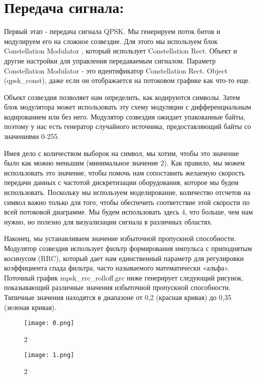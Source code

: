 \documentclass[10pt,a4paper,oneside]{article}
\begin{document}
\section{Передача сигнала:}
Первый этап - передача сигнала QPSK. Мы генерируем поток битов и модулируем его на сложное созвездие. Для этого мы используем блок Constellation Modulator , который использует Constellation Rect. Объект и другие настройки для управления передаваемым сигналом. Параметр Constellation Modulator - это идентификатор Constellation Rect. Object (qpsk_const), даже если он отображается на потоковом графике как что-то еще.

Объект созвездия позволяет нам определить, как кодируются символы. Затем блок модулятора может использовать эту схему модуляции с дифференциальным кодированием или без него. Модулятор созвездия ожидает упакованные байты, поэтому у нас есть генератор случайного источника, предоставляющий байты со значениями 0-255.

Имея дело с количеством выборок на символ, мы хотим, чтобы это значение было как можно меньшим (минимальное значение 2). Как правило, мы можем использовать это значение, чтобы помочь нам сопоставить желаемую скорость передачи данных с частотой дискретизации оборудования, которое мы будем использовать. Поскольку мы используем моделирование, количество отсчетов на символ важно только для того, чтобы обеспечить соответствие этой скорости по всей потоковой диаграмме. Мы будем использовать здесь 4, что больше, чем нам нужно, но полезно для визуализации сигнала в различных областях.

Наконец, мы устанавливаем значение избыточной пропускной способности. Модулятор созвездия использует фильтр формирования импульса с приподнятым косинусом (RRC), который дает нам единственный параметр для регулировки коэффициента спада фильтра, часто называемого математически «альфа». Поточный график mpsk_rrc_rolloff.grc ниже генерирует следующий рисунок, показывающий различные значения избыточной пропускной способности. Типичные значения находятся в диапазоне от 0,2 (красная кривая) до 0,35 (зеленая кривая).

\begin{figure}[H]
        \centering
        \texttt{[image: 0.png]}
        \caption{2}
        \label{fig:first}
\end{figure}

\begin{figure}[H]
        \centering
        \texttt{[image: 1.png]}
        \caption{2}
        \label{fig:first}
\end{figure}
\end{document}
